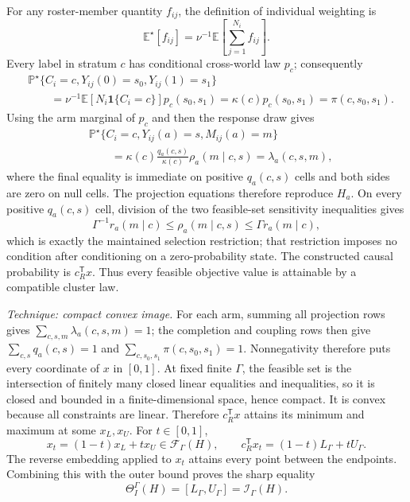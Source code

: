 For any roster-member quantity \(f_{ij}\), the definition of individual weighting is
\[
\mathbb E^{\star}[f_{ij}]
=\nu^{-1}\mathbb E\!\left[\sum_{j=1}^{N_i}f_{ij}\right].
\]
Every label in stratum \(c\) has conditional cross-world law \(p_c\); consequently
\[
\begin{aligned}
&\mathbb P^{\star}\{C_i=c,Y_{ij}(0)=s_0,Y_{ij}(1)=s_1\}\\
&\qquad=\nu^{-1}\mathbb E[N_i\mathbf 1\{C_i=c\}]p_c(s_0,s_1)
=\kappa(c)p_c(s_0,s_1)
=\pi(c,s_0,s_1).
\end{aligned}
\]
Using the arm marginal of \(p_c\) and then the response draw gives
\[
\begin{aligned}
&\mathbb P^{\star}\{C_i=c,Y_{ij}(a)=s,M_{ij}(a)=m\}\\
&\qquad=\kappa(c)\frac{q_a(c,s)}{\kappa(c)}\rho_a(m\mid c,s)
=\lambda_a(c,s,m),
\end{aligned}
\]
where the final equality is immediate on positive \(q_a(c,s)\) cells and both sides are zero on null cells.  The projection equations therefore reproduce \(H_a\).  On every positive \(q_a(c,s)\) cell, division of the two feasible-set sensitivity inequalities gives
\[
\Gamma^{-1}r_a(m\mid c)
\leq\rho_a(m\mid c,s)
\leq\Gamma r_a(m\mid c),
\]
which is exactly the maintained selection restriction; that restriction imposes no condition after conditioning on a zero-probability state.  The constructed causal probability is \(c_R^{\mathsf T}x\).  Thus every feasible objective value is attainable by a compatible cluster law.

\emph{Technique: compact convex image.}
For each arm, summing all projection rows gives \(\sum_{c,s,m}\lambda_a(c,s,m)=1\); the completion and coupling rows then give \(\sum_{c,s}q_a(c,s)=1\) and \(\sum_{c,s_0,s_1}\pi(c,s_0,s_1)=1\).  Nonnegativity therefore puts every coordinate of \(x\) in \([0,1]\).  At fixed finite \(\Gamma\), the feasible set is the intersection of finitely many closed linear equalities and inequalities, so it is closed and bounded in a finite-dimensional space, hence compact.  It is convex because all constraints are linear.  Therefore \(c_R^{\mathsf T}x\) attains its minimum and maximum at some \(x_L,x_U\).  For \(t\in[0,1]\),
\[
x_t=(1-t)x_L+t x_U\in\mathcal F_{\Gamma}(H),
\qquad
c_R^{\mathsf T}x_t=(1-t)L_{\Gamma}+tU_{\Gamma}.
\]
The reverse embedding applied to \(x_t\) attains every point between the endpoints.  Combining this with the outer bound proves the sharp equality
\[
\Theta_I^{\Gamma}(H)=[L_{\Gamma},U_{\Gamma}]=\mathcal I_{\Gamma}(H).
\]

